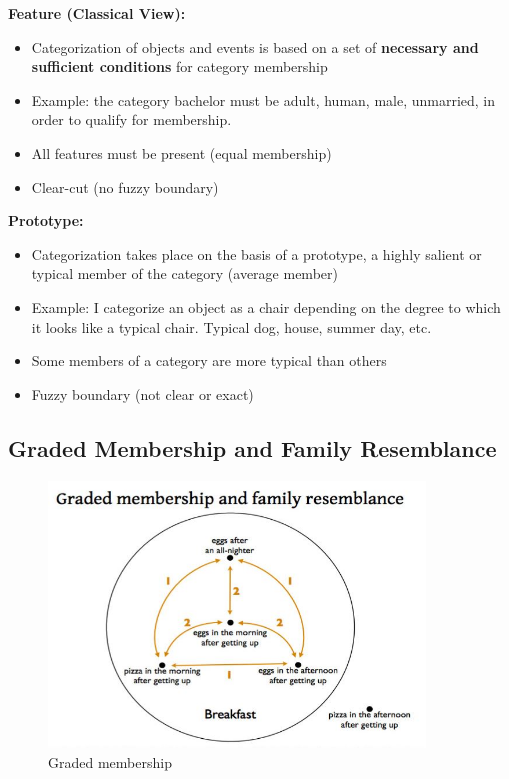 \documentclass{article}
\begin{document}
\noindent \textbf{Feature (Classical View):}
\begin{itemize}
    \item Categorization of objects and events is based on a set of \textbf{necessary and sufficient conditions} for category membership
    \item Example: the category bachelor must be adult, human, male, unmarried, in order to qualify for membership. 
    \item All features must be present (equal membership)
    \item Clear-cut (no fuzzy boundary)
\end{itemize}

\noindent \textbf{Prototype:}
\begin{itemize}
    \item Categorization takes place on the basis of a prototype, a highly salient or typical member of the category (average member)
    \item Example: I categorize an object as a chair depending on the degree to which it looks like a typical chair. Typical dog, house, summer day, etc. 
    \item Some members of a category are more typical than others 
    \item Fuzzy boundary (not clear or exact)
\end{itemize}

\subsection{Graded Membership and Family Resemblance}

\begin{figure}[htp]
\centering
\includegraphics[width=10cm]{images/Breakfast.JPG}
\caption{Graded membership}
\label{fig: Graded Membership}
\end{figure}
\end{document}
